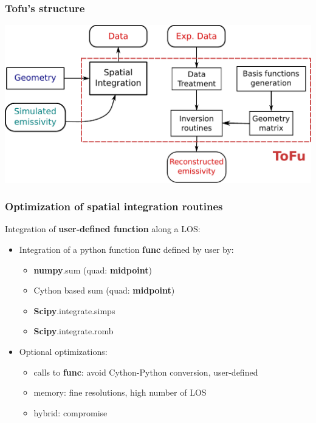 \documentclass[10pt]{beamer}
\begin{document}
\begin{frame}
\frametitle{Tofu's structure}

\begin{center}
    	\includegraphics[width=0.8\linewidth]{figures/tofu.pdf}
\end{center}
	
\end{frame}



\begin{frame}
\frametitle{Optimization of spatial integration routines}

Integration of \textbf{user-defined function} along a LOS:
	\begin{itemize}
	\item Integration of a python function \textbf{func} defined by user by:
		\begin{itemize}
		\item \textbf{numpy}.sum (quad: \textbf{midpoint})
		\item Cython based sum (quad: \textbf{midpoint})
		\item \textbf{Scipy}.integrate.simps
		\item \textbf{Scipy}.integrate.romb
		\end{itemize}
	\item Optional optimizations:
		\begin{itemize}
		\item calls to \textbf{func}: avoid Cython-Python conversion, user-defined
		\item memory: fine resolutions, high number of LOS
		\item hybrid: compromise
		\end{itemize}
	\end{itemize}
	
\end{frame}
\end{document}
